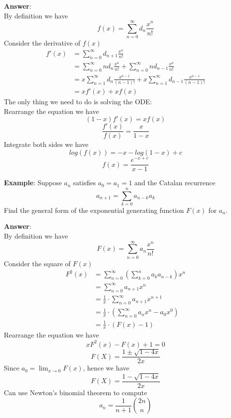 \noindent \textbf{Answer}:\\
By definition we have $$f(x)=\sum_{n=0}^{\infty}d_n\frac{x^n}{n!}$$
Consider the derivative of $f(x)$
\begin{equation}
    \begin{split}
        f'(x) &= \sum_{n=0}^{\infty}d_{n+1}\frac{x^n}{n!}\\
        &= \sum_{n=0}^{\infty}nd_n\frac{x^n}{n!}+ \sum_{n=0}^{\infty}nd_{n-1}\frac{x^n}{n!}\\
        &= x \sum_{n=1}^{\infty}d_n\frac{x^{n-1}}{(n-1)!} + x \sum_{n=1}^{\infty}d_{n-1}\frac{x^{n-1}}{(n-1)!}\\
        &= xf'(x)+xf(x)
    \end{split}
\end{equation}
The only thing we need to do is solving the ODE:\\
Rearrange the equation we have
$$(1-x)f'(x)=xf(x)$$ $$\frac{f'(x)}{f(x)}=\frac{x}{1-x}$$
Integrate both sides we have 
$$log(f(x))=-x-log(1-x)+c$$ $$f(x)=\frac{e^{-x+c}}{x-1}$$

\noindent \textbf{Example}\label{cnr}: Suppose $a_n$ satisfies $a_0=a_1=1$ 
and the Catalan recurrence $$a_{n+1}=\sum_{k=0}^{n}a_{n-k}a_k$$
Find the general form of the exponential generating function $F(x)$ for $a_n$.

\noindent \textbf{Answer}:\\
By definition we have $$F(x)=\sum_{n=0}^{\infty}a_n\frac{x^n}{n!}$$
Consider the square of $F(x)$
\begin{equation}
    \begin{split}
        F^2(x) &= \sum_{n=0}^{\infty}(\sum_{k=0}^na_ka_{n-k})x^n\\
        &= \sum_{n=0}^{\infty}a_{n+1}x^n\\
        &= \frac{1}{x} \cdot \sum_{n=0}^{\infty}a_{n+1}x^{n+1}\\
        &= \frac{1}{x} \cdot (\sum_{n=0}^{\infty}a_{n}x^{n} -a_0x^0)\\
        &= \frac{1}{x} \cdot (F(x)-1)
    \end{split}
\end{equation}
Rearrange the equation we have
$$xF^2(x)-F(x)+1=0$$
$$F(X)=\frac{1 \pm \sqrt{1-4x}}{2x}$$
Since $a_0=\lim_{x \to 0}F(x)$, hence we have 
$$F(X)=\frac{1 - \sqrt{1-4x}}{2x}$$
Can use Newton's binomial theorem to compute $$a_n=\frac{1}{n+1}{2n \choose n}$$